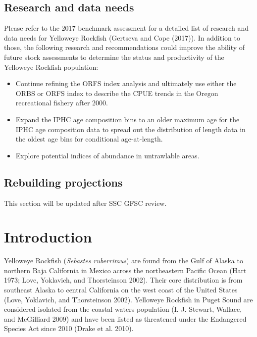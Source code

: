 \documentclass[
]{scrartcl}
\providecommand{\tightlist}{%
  \setlength{\itemsep}{0pt}\setlength{\parskip}{0pt}}\usepackage{longtable,booktabs,array}
\begin{document}
\subsection*{Research and data needs}\label{research-and-data-needs}

Please refer to the 2017 benchmark assessment for a detailed list of
research and data needs for Yelloweye Rockfish (Gertseva and Cope
(2017)). In addition to those, the following research and
recommendations could improve the ability of future stock assessments to
determine the status and productivity of the Yelloweye Rockfish
population:

\begin{itemize}
\tightlist
\item
  Continue refining the ORFS index analysis and ultimately use either
  the ORBS or ORFS index to describe the CPUE trends in the Oregon
  recreational fishery after 2000.
\item
  Expand the IPHC age composition bins to an older maximum age for the
  IPHC age composition data to spread out the distribution of length
  data in the oldest age bins for conditional age-at-length.
\item
  Explore potential indices of abundance in untrawlable areas.
\end{itemize}

\subsection*{Rebuilding projections}\label{rebuilding-projections}

This section will be updated after SSC GFSC review.

\pagebreak

\newpage{}

\setlength{\parskip}{5mm plus1mm minus1mm}
\setcounter{page}{1}
\setcounter{section}{0}
\renewcommand{\thefigure}{\arabic{figure}}
\renewcommand{\thetable}{\arabic{table}}
\setcounter{table}{0}
\setcounter{figure}{0}

\clearpage

\section{Introduction}\label{introduction}

Yelloweye Rockfish (\emph{Sebastes ruberrimus}) are found from the Gulf
of Alaska to northern Baja California in Mexico across the northeastern
Pacific Ocean (Hart 1973; Love, Yoklavich, and Thorsteinson 2002). Their
core distribution is from southeast Alaska to central California on the
west coast of the United States (Love, Yoklavich, and Thorsteinson
2002). Yelloweye Rockfish in Puget Sound are considered isolated from
the coastal waters population (I. J. Stewart, Wallace, and McGilliard
2009) and have been listed as threatened under the Endangered Species
Act since 2010 (Drake et al. 2010).
\end{document}
